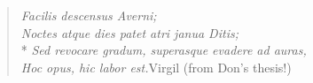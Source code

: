 \phantom{.}
\vspace{4in}

\begin{singlespace}
\begin{quote}
  \textit{Facilis descensus Averni;}\\
  \textit{Noctes atque dies patet atri janua Ditis;}\\*
  \textit{Sed revocare gradum, superasque evadere ad auras,}\\
  \textit{Hoc opus, hic labor est.}\hfill{Virgil (from Don's thesis!)}
\end{quote}
\end{singlespace}

%
